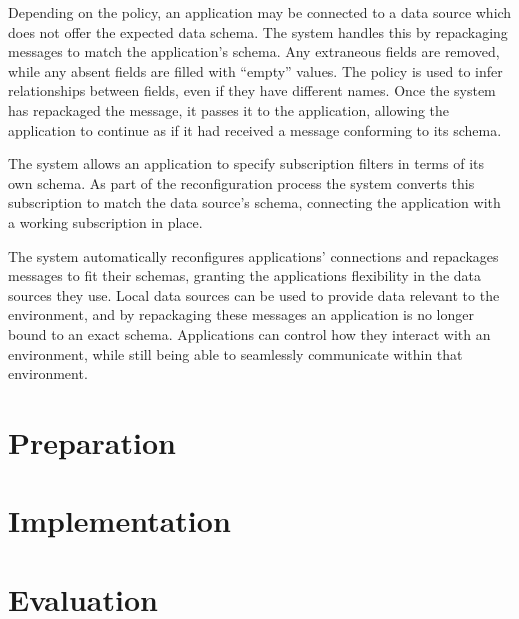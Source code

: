 \documentclass[12pt,twoside,notitlepage]{report}
\begin{document}
Depending on the policy, an application may be connected to a data source which does not offer the expected data schema. 
The system handles this by repackaging messages to match the application's schema. Any extraneous fields are removed, while any absent fields are filled with ``empty'' values. The policy is used to infer relationships between fields, even if they have different names. 
Once the system has repackaged the message, it passes it to the application, allowing the application to continue as if it had received a message conforming to its schema.

The system allows an application to specify subscription filters in terms of its own schema. 
As part of the reconfiguration process the system converts this subscription to match the data source's schema, connecting the application with a working subscription in place.

The system automatically reconfigures applications' connections and repackages messages to fit their schemas, granting the applications flexibility in the data sources they use.
Local data sources can be used to provide data relevant to the environment, and by repackaging these messages an application is no longer bound to an exact schema. 
Applications can control how they interact with an environment, while still being able to seamlessly communicate within that environment.

\cleardoublepage

 
\chapter{Preparation}


\cleardoublepage


\chapter{Implementation}


\cleardoublepage


\chapter{Evaluation}
\end{document}
